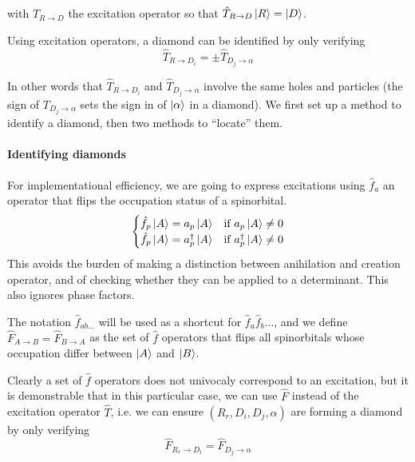 \documentclass[./thesis.tex]{subfiles}
\begin{document}
with $\hat T_{R \rightarrow D}$ the excitation operator so that $\hat T_{R \rightarrow D} \ket R = \ket D$.



Using excitation operators, a diamond can be identified by only verifying
\begin{equation}
\hat T_{R \rightarrow D_i} = \pm \hat T_{D_j \rightarrow \alpha}
\label{eq:excitation_diamond}
\end{equation}

In other words that $\hat T_{R \rightarrow D_i}$ and $\hat T_{D_j \rightarrow \alpha}$ involve the same holes and particles (the sign of $T_{D_j \rightarrow \alpha}$ sets the sign in of ${\ket{\alpha}}$ in a diamond).
We first set up a method to identify a diamond, then two methods to ``locate'' them.


\paragraph{Identifying diamonds}
For implementational efficiency, we are going to express excitations using $\hat f_a$ an operator that flips the occupation status of a spinorbital.
\begin{align}
  \begin{cases}
  \hat f_p \ket A = a_p \ket A & \text{if }  a_p \ket A \neq 0\\
  \hat f_p \ket A = a^\dagger_p \ket A & \text{if }  a^\dagger_p  \ket A \neq 0\\
  \end{cases}
\end{align}
This avoids the burden of making a distinction between anihilation and creation operator, and of checking whether they can be applied to a determinant. This also ignores phase factors.


The notation $\hat f_{ab\ldots}$ will be used as a shortcut for $\hat f_a \hat f_b \ldots$, and we define $\hat F_{A \rightarrow B} = \hat F_{B \rightarrow A}$ as the set of $\hat f$ operators that flips all spinorbitals whose occupation differ between $\ket A$ and $\ket B$.

Clearly a set of $\hat f$ operators does not univocaly correspond to an excitation, but it is demonstrable that in this particular case, we can use $\hat F$ instead of the excitation operator $\hat T$, i.e. we can ensure $(R_r, D_i, D_j, \alpha)$ are forming a diamond by only verifying
\begin{equation}
\hat F_{R_r \rightarrow D_i} = \hat F_{D_j \rightarrow \alpha}
\label{eq:diamond_flip}
\end{equation}
\end{document}
